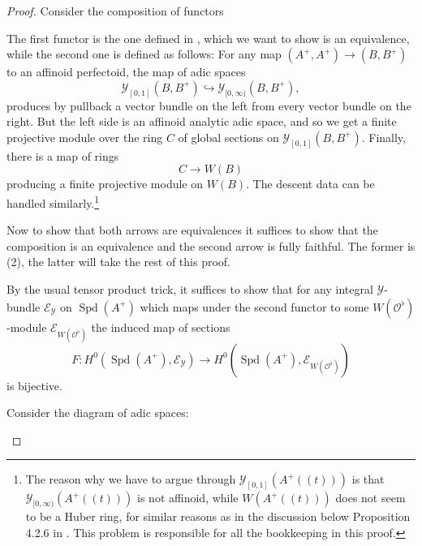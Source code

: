 \documentclass[10pt,twoside]{article}
\numberwithin{equation}{section}
\theoremstyle{plain}
\theoremstyle{definition}
\DeclareMathOperator{\Spd}{Spd}
\newcommand{\MCE}{\mathcal{E}}
\newcommand{\MCO}{\mathcal{O}}
\newcommand{\MCY}{\mathcal{Y}}
\newcommand{\Yco}{\MCY_{[0,\infty)}}
\begin{document}
\begin{proof}
Consider the composition of functors
\begin{center}
\end{center}
The first functor is the one defined in , which we want to show is an equivalence, while the second one is defined as follows: For any map \((A^+,A^+)\to (B,B^+)\) to an affinoid perfectoid, the map of adic spaces
\[\MCY_{[0,1]}(B,B^+)\hookrightarrow \Yco(B,B^+),\]
produces by pullback a vector bundle on the left from every vector bundle on the right. But the left side is an affinoid analytic adic space, and so we get a finite projective module over the ring \(C\) of global sections on \(\MCY_{[0,1]}(B,B^+)\). Finally, there is a map of rings
\[C\longrightarrow W(B)\]
producing a finite projective module on \(W(B)\). The descent data can be handled similarly.\footnote{The reason why we have to argue through \(\MCY_{[0,1]} (A^+((t)))\) is that \(\Yco(A^+((t)))\) is not affinoid, while \(W(A^+((t)))\) does not seem to be a Huber ring, for similar reasons as in the discussion below Proposition 4.2.6 in \cite{SW20}. This problem is responsible for all the bookkeeping in this proof.} \par
Now to show that both arrows are equivalences it suffices to show that the composition is an equivalence and the second arrow is fully faithful. The former is  (2), the latter will take the rest of this proof.\par
By the usual tensor product trick, it suffices to show that for any integral \(\MCY\)-bundle \(\MCE_{\MCY}\) on \(\Spd(A^+)\) which maps under the second functor to some \(W(\MCO^\flat)\)-module \(\MCE_{W(\MCO^\flat)}\) the induced map of sections
\[F\colon H^0(\Spd(A^+),\MCE_{\MCY})\longrightarrow H^0(\Spd(A^+), \MCE_{W(\MCO^\flat)})\]
is bijective. \par
 Consider the diagram of adic spaces:
    \begin{center}
\end{center}
\end{proof}
\end{document}
